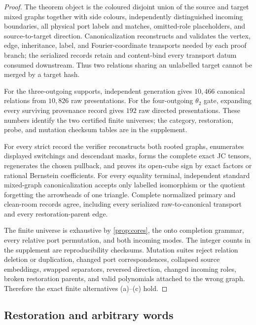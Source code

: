 \documentclass[11pt]{article}
\theoremstyle{remark}
\begin{document}
\begin{proof}
The theorem object is the coloured disjoint union of the source and target
mixed graphs together with side colours, independently distinguished incoming
boundaries, all physical port labels and matches, omitted-role placeholders,
and source-to-target direction.  Canonicalization reconstructs and validates
the vertex, edge, inheritance, label, and Fourier-coordinate transports needed
by each proof branch; the serialized records retain and content-bind every
transport datum consumed downstream.  Thus two relations sharing an
unlabelled target cannot be merged by a target hash.

For the three-outgoing supports, independent generation gives $10{,}466$
canonical relations from $10{,}826$ raw presentations.  For the
four-outgoing $\theta_2$ gate, expanding every surviving provenance record
gives $192$ raw directed presentations.  These numbers identify the two
certified finite universes; the category, restoration, probe, and mutation
checksum tables are in the supplement.

For every strict record the verifier reconstructs both rooted graphs,
enumerates displayed switchings and descendant masks, forms the complete
exact JC tensors, regenerates the chosen pullback, and proves its open-cube
sign by exact factors or rational Bernstein coefficients.  For every equality
terminal, independent standard mixed-graph canonicalization accepts only
labelled isomorphism or the quotient forgetting the arrowheads of one
triangle.  Complete normalized primary and clean-room records agree,
including every serialized raw-to-canonical transport and every
restoration-parent edge.

The finite universe is exhaustive by \cref{prop:cores}, the onto completion
grammar, every relative port permutation, and both incoming modes.  The
integer counts in the supplement are reproducibility checksums.  Mutation suites reject
relation deletion or duplication, changed port correspondences, collapsed
source embeddings, swapped separators, reversed direction, changed
incoming roles, broken restoration parents, and valid polynomials attached
to the wrong graph.  Therefore the exact finite alternatives (a)--(c) hold.
\end{proof}

\subsection{Restoration and arbitrary words}
\end{document}
